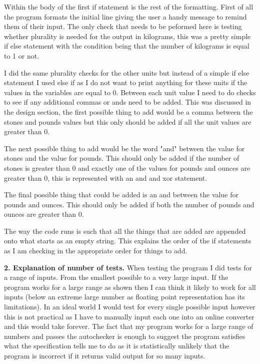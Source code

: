 \documentclass[a4paper]{article}
\begin{document}
Within the body of the first if statement is the rest of the formatting. First of all the program formats the initial line giving the user a handy 
message to remind them of their input. The only check that needs to be peformed here is testing whether plurality is needed for the output in 
kilograms, this was a pretty simple if else statement with the condition being that the number of kilograms is equal to 1 or not.

I did the same plurality checks for the other units but instead of a simple if else statement I used else if as I do not want to print anything for 
these units if the values in the variables are equal to 0. Between each unit value I need to do checks to see if any additional commas or ands need to 
be added. This was discussed in the design section, the first possible thing to add would be a comma between the stones and pounds values but this 
only should be added if all the unit values are greater than 0. 

The next possible thing to add would be the word "and" between the value for stones and the value for pounds. This should only be added if the number 
of stones is greater than 0 and exactly one of the values for pounds and ounces are greater than 0, this is represented with an and and xor statement. 

The final possible thing that could be added is an and between the value for pounds and ounces. This should only be added if both the number of pounds 
and ounces are greater than 0.

The way the code runs is such that all the things that are added are appended onto what starts as an empty string. This explains the order of the if 
statements as I am checking in the appropriate order for things to add.

\noindent \textbf{2. Explanation of number of tests.}
When testing the program I did tests for a range of inputs. From the smallest possible to a very large input. If the program works for a large range 
as shown then I can think it likely to work for all inputs (below an extreme large number as floating point representation has its limitations). In an 
ideal world I would test for every single possible input however this is not practical as I have to manually input each one into an online converter 
and this would take forever. The fact that my program works for a large range of numbers and passes the autochecker is enough to suggest the program 
satisfies what the specification tells me to do as it is statistically unlikely that the program is incorrect if it returns valid output for so many 
inputs.
\end{document}
